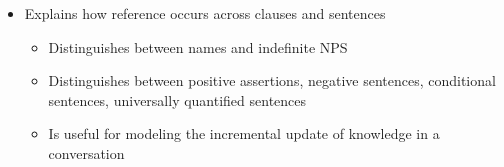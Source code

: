 \documentclass[headrule,footrule]{foils}
\begin{document}



\begin{itemize}
\item Explains how reference occurs across clauses and sentences
  \begin{itemize}
  \item Distinguishes between names and indefinite NPS
  \item Distinguishes between positive assertions, negative sentences,
    conditional sentences, universally quantified sentences
  \item Is useful for modeling the incremental update of knowledge in a conversation
  \end{itemize}
\end{itemize}
\end{document}
